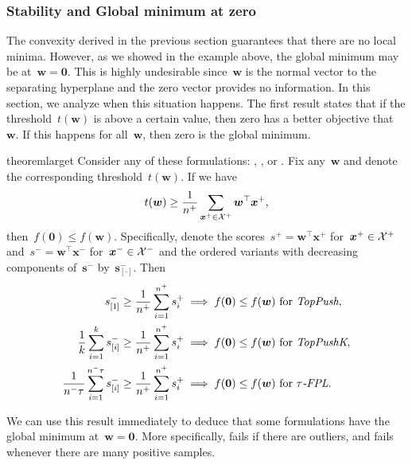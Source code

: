 \subsubsection{Stability and Global minimum at zero}\label{sec:w_zero}

The convexity derived in the previous section guarantees that there are no local minima. However, as we showed in the example above, the global minimum may be at~$\bm{w} = \bm{0}$. This is highly undesirable since~$\bm{w}$ is the normal vector to the separating hyperplane and the zero vector provides no information. In this section, we analyze when this situation happens. The first result states that if the threshold~$t(\bm{w})$ is above a certain value, then zero has a better objective that~$\bm{w}$. If this happens for all~$\bm{w}$, then zero is the global minimum.

\begin{restatable}{theorem}{larget}\label{thm:large_t}
  Consider any of these formulations: \TopPush, \TopPushK, \TopMeanK or \tauFPL. Fix any~$\bm{w}$ and denote the corresponding threshold~$t(\bm{w})$. If we have
  \begin{equation}\label{eq:w_zero_nn}
    t(\bm{w})\ge \frac{1}{n^+} \sum_{\bm{x}^+ \in \mathcal{X}^+} \bm{w}^\top \bm{x}^+,
  \end{equation}
  then~$f(\bm{0})\le f(\bm{w})$. Specifically, denote the scores~$s^+=\bm{w}^\top \bm{x}^+$ for~$\bm{x}^+\in \mathcal{X}^+$ and~$s^-=\bm{w}^\top \bm{x}^-$ for~$\bm{x}^-\in \mathcal{X}^-$ and the ordered variants with decreasing components of~$\bm{s}^-$ by~$\bm{s}_{[\cdot]}^-$. Then
  \begin{equation}\label{eq:w_zero}
    \begin{aligned}
    s_{[1]}^- \ge \frac{1}{n^+} \sum_{i=1}^{n^+} s_{i}^+
    & \implies f(\bm{0}) \le f(\bm{w}) \text{ for } \emph{TopPush}, \\
    \frac{1}{k}\sum_{i=1}^k s_{[i]}^- \ge \frac{1}{n^+} \sum_{i=1}^{n^+} s_{i}^+
    & \implies f(\bm{0})\le f(\bm{w}) \text{ for } \emph{TopPushK}, \\
    \frac{1}{n^-\tau} \sum_{i=1}^{n^-\tau} s_{[i]}^- \ge \frac{1}{n^+}\sum_{i=1}^{n^+} s_{i}^+
    & \implies f(\bm{0}) \le f(\bm{w}) \text{ for } {\emph{$\tau$-FPL}}. \\
    \end{aligned}
  \end{equation}
\end{restatable}

We can use this result immediately to deduce that some formulations have the global minimum at~$\bm{w} = \bm{0}$. More specifically, \TopPush fails if there are outliers, and \TopMeanK fails whenever there are many positive samples.


